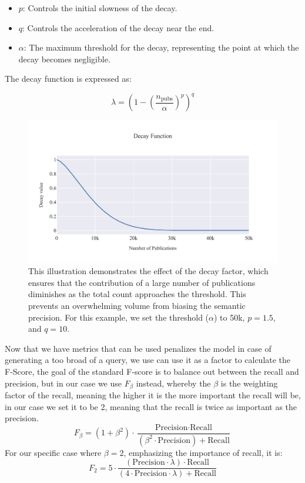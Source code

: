 \begin{itemize}
	\item \( p \): Controls the initial slowness of the decay.
	\item \( q \): Controls the acceleration of the decay near the end.
	\item $\alpha$: The maximum threshold for the decay, representing the point at which the decay becomes negligible.
\end{itemize}

The decay function is expressed as:

\[
\lambda = \left(1 - \left(\frac{n_{\text{pubs}}}{\alpha}\right)^p\right)^q
\]


\begin{figure}[h!]
	\centering	
	\includegraphics[scale=0.7]{pics/decay_function.pdf}
	\caption[Decay Function for Semantic Precision]{This illustration demonstrates the effect of the decay factor, which ensures that the contribution of a large number of publications diminishes as the total count approaches the threshold. This prevents an overwhelming volume from biasing the semantic precision. For this example, we set the threshold (\( \alpha \)) to 50k, \( p=1.5 \), and \( q=10 \).}	
	\label{fig:decay-function}
\end{figure}


Now that we have metrics that can be used penalizes the model in case of generating a too broad of a query, we use can use it as a factor to calculate the F-Score, the goal of the standard F-score is to balance out between the recall and precision, but in our case we use $F_\beta$ instead, whereby the $\beta$ is the weighting factor of the recall, meaning the higher it is the more important the recall will be, in our case we set it to be 2, meaning that the recall is twice as important as the precision.
\begin{equation}\label{eq:f-beta}
F_\beta = (1 + \beta^2) \cdot \frac{\text{Precision} \cdot \text{Recall}}{(\beta^2 \cdot \text{Precision}) + \text{Recall}}
\end{equation}
For our specific case where $\beta = 2$, emphasizing the importance of recall, it is:
\[
	F_2 = 5 \cdot \frac{(\text{Precision} \cdot \lambda) \cdot \text{Recall}}{(4 \cdot \text{Precision}\cdot \lambda) + \text{Recall}}
\]

